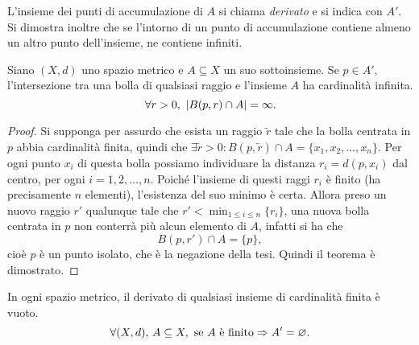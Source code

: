 L'insieme dei punti di accumulazione di $A$ si chiama \emph{derivato} e si indica con $A'$. Si dimostra inoltre che se l'intorno di un punto di accumulazione contiene almeno un altro punto dell'insieme, ne contiene infiniti.
\begin{teorema}
Siano $(X,d)$ uno spazio metrico e $A\subseteq X$ un suo sottoinsieme. Se $p\in A'$, l'intersezione tra una bolla di qualsiasi raggio e l'insieme $A$ ha cardinalità infinita.
\[
	\forall r>0,\ \card{B(p,r)\cap A}=\infty.
\]
\end{teorema}
\begin{proof}
Si supponga per assurdo che esista un raggio $\tilde{r}$ tale che la bolla centrata in $p$ abbia cardinalità finita, quindi che $\exists\tilde{r}>0\colon B(p,\tilde{r})\cap A=\{x_1,x_2,\dots,x_n\}$. Per ogni punto $x_i$ di questa bolla possiamo individuare la distanza $r_i=d(p,x_i)$ dal centro, per ogni $i=1,2,\dots,n$. Poiché l'insieme di questi raggi $r_i$ è finito (ha precisamente $n$ elementi), l'esistenza del suo minimo è certa. Allora preso un nuovo raggio $r'$ qualunque tale che $r'<\min_{1\leq i\leq n}\{r_i\}$, una nuova bolla centrata in $p$ non conterrà più alcun elemento di $A$, infatti si ha che
\[
B(p,r')\cap A=\{p\},
\]
cioè $p$ è un punto isolato, che è la negazione della tesi. Quindi il teorema è dimostrato.
\end{proof}
\begin{corollario}
In ogni spazio metrico, il derivato di qualsiasi insieme di cardinalità finita è vuoto.
\[
\forall (X,d),\, A\subseteq X,\text{ se $A$ è finito}\Rightarrow A'=\varnothing.
\]
\end{corollario}
